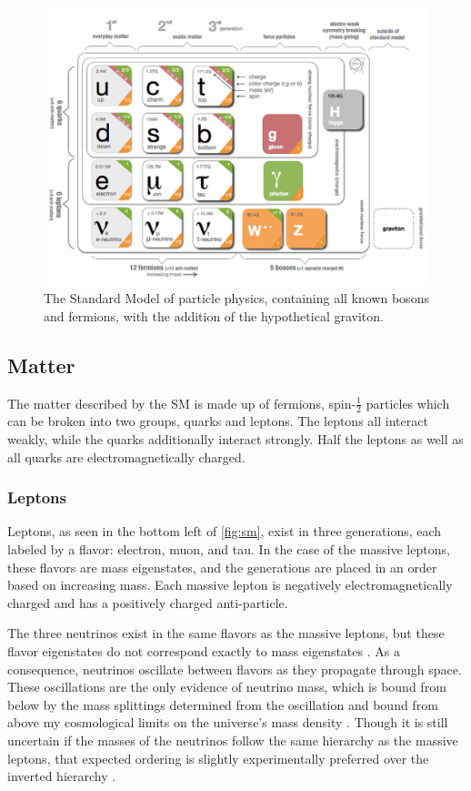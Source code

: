 \begin{centering}
\begin{figure}[bth]
\myfloatalign
\includegraphics[width=.85\linewidth]{figures/theory/standardmodel.png}
\caption{The Standard Model of particle physics, containing all known bosons and fermions, with the addition of the hypothetical graviton. \cite{Galbraith:2012}}
\label{fig:sm}
\end{figure}
\end{centering}

\subsection{Matter}
\label{sec:matter}

The matter described by the \ac{SM} is made up of fermions, spin-$\frac{1}{2}$ particles which can be broken into two groups, quarks and leptons. The leptons all interact weakly, while the quarks additionally interact strongly. Half the leptons as well as all quarks are electromagnetically charged. 

\subsubsection{Leptons}

Leptons, as seen in the bottom left of \autoref{fig:sm}, exist in three generations, each labeled by a flavor: electron, muon, and tau. In the case of the massive leptons, these flavors are mass eigenstates, and the generations are placed in an order based on increasing mass. Each massive lepton is negatively electromagnetically charged and has a positively charged anti-particle. 

The three neutrinos exist in the same flavors as the massive leptons, but these flavor eigenstates do not correspond exactly to mass eigenstates \cite{Griffiths:111880}. As a consequence, neutrinos oscillate between flavors as they propagate through space. These oscillations are the only evidence of neutrino mass, which is bound from below by the mass splittings determined from the oscillation and bound from above my cosmological limits on the universe's mass density \cite{1979PhLB...87..144H}. Though it is still uncertain if the masses of the neutrinos follow the same hierarchy as the massive leptons, that expected ordering is slightly experimentally preferred over the inverted hierarchy \cite{Huang:2016}. 

